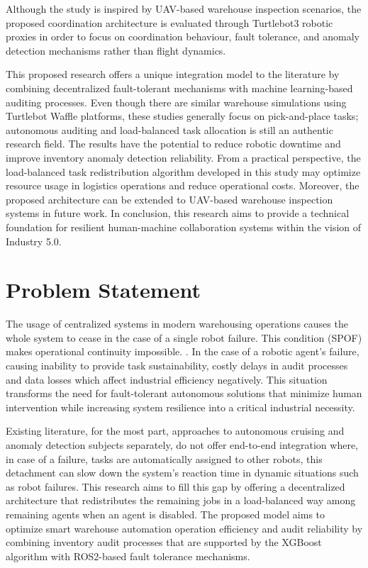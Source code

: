 \documentclass[conference]{IEEEtran}
\begin{document}
Although the study is inspired by UAV-based warehouse inspection scenarios, the proposed coordination architecture is evaluated through Turtlebot3 robotic proxies in order to focus on coordination behaviour, fault tolerance, and anomaly detection mechanisms rather than flight dynamics. 

This proposed research offers a unique integration model to the literature by combining decentralized fault-tolerant mechanisms with machine learning-based auditing processes. Even though there are similar warehouse simulations using Turtlebot Waffle platforms, these studies generally focus on pick-and-place tasks\cite{leite2024coordination}; autonomous auditing and load-balanced task allocation is still an authentic research field. The results have the potential to reduce robotic downtime and improve inventory anomaly detection reliability. From a practical perspective, the load-balanced task redistribution algorithm developed in this study may optimize resource usage in logistics operations and reduce operational costs. Moreover, the proposed architecture can be extended to UAV-based warehouse inspection systems in future work. In conclusion, this research aims to provide a technical foundation for resilient human-machine collaboration systems within the vision of Industry 5.0.

 
\section{Problem Statement}

The usage of centralized systems in modern warehousing operations causes the whole system to cease in the case of a single robot failure. This condition (SPOF) makes operational continuity impossible. \cite{abro2024synergistic}. In the case of a robotic agent's failure, causing inability to provide task sustainability, costly delays in audit processes and data losses which affect industrial efficiency negatively\cite{arvind2025intelligent}. This situation transforms the need for fault-tolerant autonomous solutions that minimize human intervention while increasing system resilience into a critical industrial necessity.

Existing literature, for the most part, approaches to autonomous cruising and anomaly detection subjects separately, do not offer end-to-end integration where, in case of a failure, tasks are automatically assigned to other robots\cite{zhang2025autonomous}, this detachment can slow down the system's reaction time in dynamic situations such as robot failures. This research aims to fill this gap by offering a decentralized architecture that redistributes the remaining jobs in a load-balanced way among remaining agents when an agent is disabled. The proposed model aims to optimize smart warehouse automation operation efficiency and audit reliability by combining inventory audit processes that are supported by the XGBoost algorithm with ROS2-based fault tolerance mechanisms.
\end{document}

